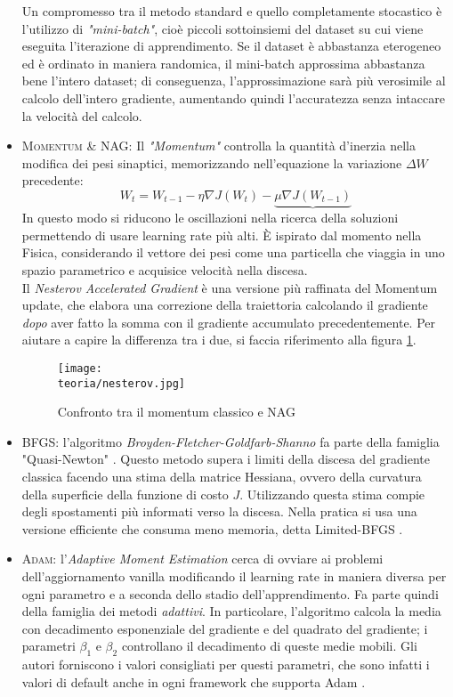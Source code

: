 \begin{itemize}
Un compromesso tra il metodo standard e quello completamente stocastico è l'utilizzo di \emph{"mini-batch"}, cioè piccoli sottoinsiemi del dataset su cui viene eseguita l'iterazione di apprendimento. Se il dataset è abbastanza eterogeneo ed è ordinato in maniera randomica, il mini-batch approssima abbastanza bene l'intero dataset; di conseguenza, l'approssimazione sarà più verosimile al calcolo dell'intero gradiente, aumentando quindi l'accuratezza senza intaccare la velocità del calcolo. 
\item \textsc{Momentum \& NAG}: Il \emph{"Momentum"} controlla la quantità d'inerzia nella modifica dei pesi sinaptici, memorizzando nell'equazione la variazione $\Delta W$ precedente:
$$
W_{t} = W_{t-1} - \eta \nabla J(W_{t})- \underbrace{\mu\nabla 
J(W_{t-1})} 
$$ 
In questo modo si riducono le oscillazioni nella ricerca della soluzioni permettendo di usare learning rate più alti. È ispirato dal momento nella Fisica, considerando il vettore dei pesi come una particella che viaggia in uno spazio parametrico e acquisice velocità nella discesa. \\
Il \emph{Nesterov Accelerated Gradient} è una versione più raffinata del Momentum update, che elabora una correzione della traiettoria calcolando il gradiente \emph{dopo} aver fatto la somma con il gradiente accumulato precedentemente. Per aiutare a capire la differenza tra i due, si faccia riferimento alla figura \ref{fig:nag}.
\begin{figure}[h!]
 \centering
 \texttt{[image: \\teoria/nesterov.jpg]}
 \caption{Confronto tra il momentum classico e NAG}
 \label{fig:nag}
\end{figure}
\item \textsc{BFGS}: l'algoritmo \emph{Broyden-Fletcher-Goldfarb-Shanno} fa parte della famiglia "Quasi-Newton"  \parencite{Wquasinewton}. Questo metodo supera i limiti della discesa del gradiente classica facendo una stima della matrice Hessiana, ovvero della curvatura della superficie della funzione di costo $J$. Utilizzando questa stima compie degli spostamenti più informati verso la discesa. Nella pratica si usa una versione efficiente che consuma meno memoria, detta Limited-BFGS \parencite{WLBFGS}. 

\item \textsc{Adam}: l'\emph{Adaptive Moment Estimation} cerca di ovviare ai problemi dell'aggiornamento vanilla modificando il learning rate in maniera diversa per ogni parametro e a seconda dello stadio dell'apprendimento. Fa parte quindi della famiglia dei metodi \emph{adattivi}. In particolare, l'algoritmo calcola la media con decadimento esponenziale del gradiente e del quadrato del gradiente; i parametri $\beta_1$ e $\beta_2$ controllano il decadimento di queste medie mobili. Gli autori forniscono i valori consigliati per questi parametri, che sono infatti i valori di default anche in ogni framework che supporta Adam \parencite{WAdam}.
\end{itemize}
